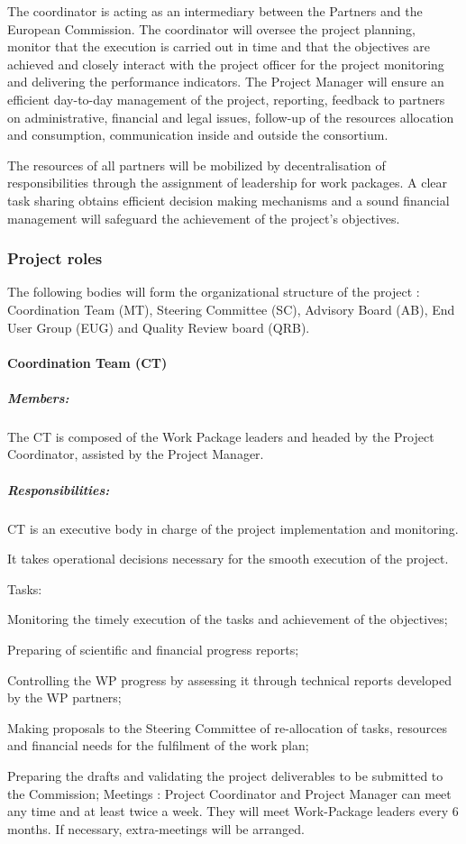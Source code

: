 The coordinator is acting as an intermediary between the Partners and
the European Commission. The coordinator will oversee the project
planning, monitor that the execution is carried out in time and that
the objectives are achieved and closely interact with the project
officer for the project monitoring and delivering the performance
indicators.  The Project Manager will ensure an efficient day-to-day
management of the project, reporting, feedback to partners on
administrative, financial and legal issues, follow-up of the resources
allocation and consumption, communication inside and outside the
consortium.

The resources of all partners will be mobilized by decentralisation of
responsibilities through the assignment of leadership for work
packages. A clear task sharing obtains efficient decision making
mechanisms and a sound financial management will safeguard the
achievement of the project’s objectives.

\subsubsection{Project roles}

The following bodies will form the organizational structure of the
\TheProject project : Coordination Team (MT), Steering Committee (SC),
Advisory Board (AB), End User Group (EUG) and Quality Review board
(QRB).


\paragraph{Coordination Team (CT)} 
\subparagraph{Members:} The CT is composed of the Work Package leaders
and headed by the Project Coordinator, assisted by the Project
Manager.

\subparagraph{Responsibilities:} CT is an executive body in charge of
the project implementation and monitoring.

It takes operational decisions necessary for the smooth execution of
the project.

Tasks:
\begin{compactenum} 
\item Monitoring the timely execution of the tasks and achievement of
  the objectives;
\item Preparing of scientific and financial progress reports;
\item Controlling the WP progress by assessing it through technical
  reports developed by the WP partners;
\item Making proposals to the Steering Committee of re-allocation of
  tasks, resources and financial needs for the fulfilment of the work
  plan;
\item Preparing the drafts and validating the project deliverables to
  be submitted to the Commission; Meetings : Project Coordinator and
  Project Manager can meet any time and at least twice a week. They
  will meet Work-Package leaders every 6 months. If necessary,
  extra-meetings will be arranged.
\end{compactenum} 

